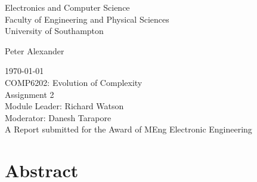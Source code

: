 \documentclass[12pt]{article}
\begin{document}
\begin{titlepage}
    \begin{center}
        {\LARGE Electronics and Computer Science\\ Faculty of Engineering and Physical Sciences\\}
        \vspace{0.4cm}
        {\LARGE University of Southampton}
        
        \vfill
        {\Large Peter Alexander\\}
        
        \vspace{1cm}
        {\Large \today\\}
        \vspace{1cm}
        {\LARGE COMP6202: Evolution of Complexity\\}
        {\Large Assignment 2\\}
        \vfill
        {\Large Module Leader: Richard Watson\\}
        \vspace{0.3cm}
        {\Large Moderator: Danesh Tarapore\\}
        \vfill
        \Large A Report submitted for the Award of MEng Electronic Engineering

    \end{center}
    \restoregeometry
\end{titlepage}

\section*{Abstract}
\newpage


\newpage
\setcounter{tocdepth}{2}

\newpage
\tableofcontents
\newpage
\setcounter{page}{1}
\pagestyle{plain}








\printbibliography

\pagestyle{empty}

\appendix


\end{document}
